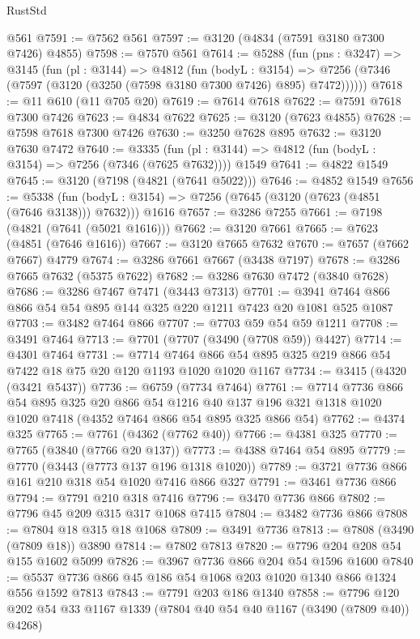 \begin{lexlean}{RustStd}
\begin{coremodule}
    @561
@7591 := @7562 @561
@7597 := @3120 (@4834 (@7591 @3180 @7300 @7426) @4855)
@7598 := @7570 @561
@7614 := @5288
    (fun (pns : @3247) =>
    @3145
      (fun (pl : @3144) =>
      @4812
        (fun (bodyL : @3154) =>
        @7256 (@7346 (@7597 (@3120 (@3250 (@7598 @3180 @7300 @7426) @895) @7472))))))
@7618 := @11 @610 (@11 @705 @20)
@7619 := @7614 @7618
@7622 := @7591 @7618 @7300 @7426
@7623 := @4834 @7622
@7625 := @3120 (@7623 @4855)
@7628 := @7598 @7618 @7300 @7426
@7630 := @3250 @7628 @895
@7632 := @3120 @7630 @7472
@7640 := @3335
    (fun (pl : @3144) => @4812 (fun (bodyL : @3154) => @7256 (@7346 (@7625 @7632))))
    @1549
@7641 := @4822 @1549
@7645 := @3120 (@7198 (@4821 (@7641 @5022)))
@7646 := @4852 @1549
@7656 := @5338
    (fun (bodyL : @3154) => @7256 (@7645 (@3120 (@7623 (@4851 (@7646 @3138))) @7632)))
    @1616
@7657 := @3286 @7255
@7661 := @7198 (@4821 (@7641 (@5021 @1616)))
@7662 := @3120 @7661
@7665 := @7623 (@4851 (@7646 @1616))
@7667 := @3120 @7665 @7632
@7670 := @7657 (@7662 @7667) @4779
@7674 := @3286 @7661 @7667 (@3438 @7197)
@7678 := @3286 @7665 @7632 (@5375 @7622)
@7682 := @3286 @7630 @7472 (@3840 @7628)
@7686 := @3286 @7467 @7471 (@3443 @7313)
@7701 := @3941 @7464 @866 @866 @54 @54 @895 @144 @325 @220 @1211 @7423 @20 @1081 @525 @1087
@7703 := @3482 @7464 @866
@7707 := @7703 @59 @54 @59 @1211
@7708 := @3491 @7464
@7713 := @7701 (@7707 (@3490 (@7708 @59)) @4427)
@7714 := @4301 @7464
@7731 := @7714 @7464 @866 @54 @895 @325 @219 @866 @54 @7422 @18 @75 @20 @120 @1193 @1020 @1020 @1167
@7734 := @3415 (@4320 (@3421 @5437))
@7736 := @6759 (@7734 @7464)
@7761 := @7714
    @7736
    @866
    @54
    @895
    @325
    @20
    @866
    @54
    @1216
    @40
    @137
    @196
    @321
    @1318
    @1020
    @1020
    @7418
    (@4352 @7464 @866 @54 @895 @325 @866 @54)
@7762 := @4374 @325
@7765 := @7761 (@4362 (@7762 @40))
@7766 := @4381 @325
@7770 := @7765 (@3840 (@7766 @20 @137))
@7773 := @4388 @7464 @54 @895
@7779 := @7770 (@3443 (@7773 @137 @196 @1318 @1020))
@7789 := @3721 @7736 @866 @161 @210 @318 @54 @1020 @7416 @866 @327
@7791 := @3461 @7736 @866
@7794 := @7791 @210 @318 @7416
@7796 := @3470 @7736 @866
@7802 := @7796 @45 @209 @315 @317 @1068 @7415
@7804 := @3482 @7736 @866
@7808 := @7804 @18 @315 @18 @1068
@7809 := @3491 @7736
@7813 := @7808 (@3490 (@7809 @18)) @3890
@7814 := @7802 @7813
@7820 := @7796 @204 @208 @54 @155 @1602 @5099
@7826 := @3967 @7736 @866 @204 @54 @1596 @1600
@7840 := @5537 @7736 @866 @45 @186 @54 @1068 @203 @1020 @1340 @866 @1324 @556 @1592 @7813
@7843 := @7791 @203 @186 @1340
@7858 := @7796 @120 @202 @54 @33 @1167 @1339 (@7804 @40 @54 @40 @1167 (@3490 (@7809 @40)) @4268)

\end{coremodule}
\end{lexlean}
